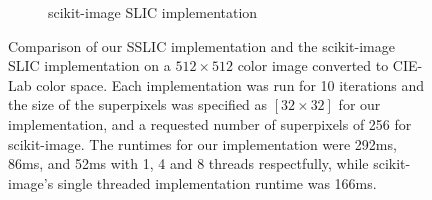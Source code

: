 \documentclass{InsightArticle}
\begin{document}
\begin{figure}
\begin{subfigure}{0.4\textwidth}
  \caption{scikit-image SLIC implementation}
  \label{fig:b}
\end{subfigure}
\caption{Comparison of our SSLIC implementation and the scikit-image~\cite{scikit-image} SLIC
  implementation on a $512 \times 512$ color image converted to CIE-Lab color
  space. Each implementation was run for 10 iterations and the size of the
  superpixels was specified as $[32 \times 32]$ for our implementation, and a
  requested number of superpixels of 256 for scikit-image. The runtimes for our
  implementation were 292ms, 86ms, and 52ms with 1, 4 and 8 threads
  respectfully, while scikit-image's single threaded implementation runtime was 166ms.}
\label{fig:astronaut}
\end{figure}

\begin{figure}


\end{figure}
\end{document}
